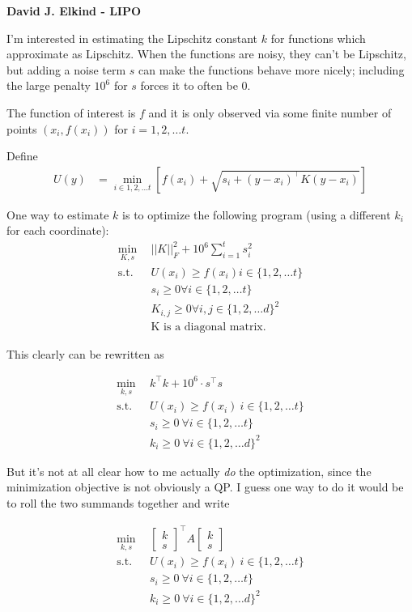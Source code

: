 \documentclass[11pt]{article}
\begin{document}
\begin{center}
  \textbf{David J. Elkind - LIPO} \\
\end{center}

I'm interested in estimating the Lipschitz constant $k$ for functions which approximate as Lipschitz. When the functions are noisy, they can't be Lipschitz, but adding a noise term $s$ can make the functions behave more nicely; including the large penalty $10^6$ for $s$ forces it to often be 0.

The function of interest is $f$ and it is only observed via some finite number of points $(x_i, f(x_i))$ for $i = 1,2,\dots t$.

Define
\begin{align}
U(y) &= \min_{i \in 1,2,\dots t} \left[ f(x_i) + \sqrt{s_i + (y - x_i)^\top K (y - x_i)} \right]
\end{align}

One way to estimate $k$ is to optimize the following program (using a different $k_i$ for each coordinate):
\begin{align}
  \min_{K, s}~~& ||K||_F^2 + 10^6 \sum_{i=1}^t s_i^2 \\
  \text{s.t.}~~& U(x_i) \ge f(x_i) i \in \{1,2, \dots t\} \\
  & s_i \ge 0 \forall i \in \{1,2, \dots t\} \\
  & K_{i,j} \ge 0 \forall i,j \in \{1, 2, \dots d\}^2 \\
  & \text{K is a diagonal matrix.} 
\end{align}

This clearly can be rewritten as 

\begin{align}
  \min_{k, s}~~& k^\top k + 10^6 \cdot s^\top s \\
  \text{s.t.}~~& U(x_i) \ge f(x_i) ~ i \in \{1,2, \dots t\} \\
  & s_i \ge 0 ~ \forall i \in \{1,2, \dots t\} \\
  & k_{i} \ge 0 ~ \forall i \in \{1, 2, \dots d\}^2 
\end{align}

But it's not at all clear how to me actually \textit{do} the optimization, since the  minimization objective is not obviously a QP. I guess one way to do it would be to roll the two summands together and write

\begin{align}
  \min_{k, s}~~& \begin{bmatrix}k \\ s \end{bmatrix}^\top A \begin{bmatrix}k \\ s \end{bmatrix} \\
  \text{s.t.}~~& U(x_i) \ge f(x_i) ~ i \in \{1,2, \dots t\} \\
  & s_i \ge 0 ~ \forall i \in \{1,2, \dots t\} \\
  & k_{i} \ge 0 ~ \forall i \in \{1, 2, \dots d\}^2 
\end{align}
\end{document}
